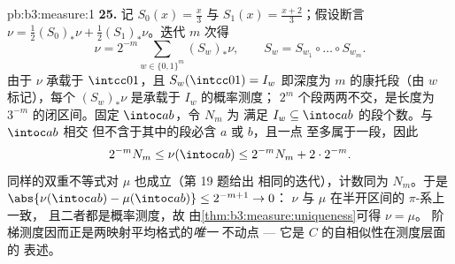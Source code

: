\begin{solution}{pb:b3:measure:1}
\textbf{25.} 记 $S_0(x) = \frac x3$ 与 $S_1(x) =
\frac{x+2}3$；假设断言 $\nu = \frac12(S_0)_*\nu +
\frac12(S_1)_*\nu$。迭代 $m$ 次得
\[
\nu = 2^{-m}\sum_{w \in \{0,1\}^m}(S_w)_*\nu,
\qquad S_w = S_{w_1}\circ\dots\circ S_{w_m}.
\]
由于 $\nu$ 承载于 $\intcc01$，且 $S_w(\intcc01) =
I_w$ 即深度为 $m$ 的康托段（由 $w$ 标记），每个
$(S_w)_*\nu$ 是承载于 $I_w$ 的概率测度；
$2^m$ 个段两两不交，是长度为
$3^{-m}$ 的闭区间。固定 $\intoc ab$，令 $N_m$ 为
满足 $I_w \subseteq \intoc ab$ 的段个数。与 $\intoc ab$ 相交
但不含于其中的段必含 $a$ 或 $b$，且一点
至多属于一段，因此
\[
2^{-m}N_m \leq \nu(\intoc ab) \leq 2^{-m}N_m + 2\cdot2^{-m}.
\]
同样的双重不等式对 $\mu$ 也成立（第 19 题给出
相同的迭代），计数同为 $N_m$。于是
$\abs{\nu(\intoc ab) - \mu(\intoc ab)} \leq 2^{-m+1} \to 0$：
$\nu$ 与 $\mu$ 在半开区间的 $\pi$-系上一致，
且二者都是概率测度，故
由\cref{thm:b3:measure:uniqueness}可得 $\nu = \mu$。
阶梯测度因而正是两映射平均格式的\emph{唯一}
不动点 --- 它是 $C$ 的自相似性在测度层面的
表述。
\end{solution}
